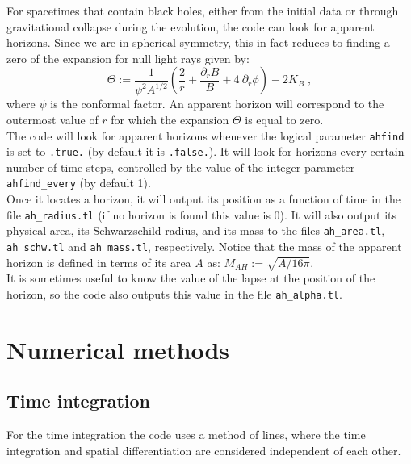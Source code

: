 \documentclass[12pt]{article}
\begin{document}
For spacetimes that contain black holes, either from the initial data
or through gravitational collapse during the evolution, the code can
look for apparent horizons.  Since we are in spherical symmetry, this
in fact reduces to finding a zero of the expansion for null light rays
given by:
\begin{equation}
\Theta := \frac{1}{\psi^2 A^{1/2}} \left( \frac{2}{r} + \frac{\partial_r B}{B}
+ 4 \: \partial_r \phi \right) - 2 K_B \; ,
\end{equation}
where $\psi$ is the conformal factor.  An apparent horizon will
correspond to the outermost value of $r$ for which the expansion
$\Theta$ is equal to zero. \\

The code will look for apparent horizons whenever the logical
parameter \texttt{ahfind} is set to \texttt{.true.} (by default it is
\texttt{.false.}).  It will look for horizons every certain number of
time steps, controlled by the value of the integer parameter
\texttt{ahfind\_every} (by default 1). \\

Once it locates a horizon, it will output its position as a function
of time in the file \texttt{ah\_radius.tl} (if no horizon is found
this value is 0). It will also output its physical area, its
Schwarzschild radius, and its mass to the files \texttt{ah\_area.tl},
\texttt{ah\_schw.tl} and \texttt{ah\_mass.tl}, respectively.  Notice
that the mass of the apparent horizon is defined in terms of its area
$A$ as: $M_{AH} := \sqrt{ A/16 \pi}$. \\

It is sometimes useful to know the value of the lapse at the position
of the horizon, so the code also outputs this value in the file
\texttt{ah\_alpha.tl}. \\



\setcounter{equation}{0}
\section{Numerical methods}
\label{sec:numerics}

\subsection{Time integration}

For the time integration the code uses a method of lines, where the
time integration and spatial differentiation are considered
independent of each other. \\
\end{document}
